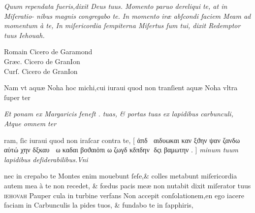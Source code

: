 \documentclass{article}
\newcommand{\threecolumntypefacenames}[3]{\begin{multicols}{3}
		\tiny
		\hfill \qquad \qquad \qquad \qquad #1\hspace*{\fill}\\
		\columnbreak
		\hfill #2\hspace*{\fill}\\
		\columnbreak
		\hfill #3\qquad \qquad \qquad \qquad \hspace*{\fill}
\end{multicols}}
\begin{document}
{\begin{multicols}{2}
	\columnbreak
	\fontsize{8}{9}\selectfont
	\justifying
	\noindent
	\textit{Quum rependata fueris,dixit Deus tuus. Momento paruo dereliqui te, at in Miſeratio-\linebreak
		nibus magnis congregabo te. In momento ir\ae{} abſcondi faciem {M}eam ad momentum \`a te,\linebreak
		In miſericordia ſempiterna Miſertus ſum tui, dixit Redemptor tuus Iehouah.}
\end{multicols}
\vspace{-3.5\baselineskip}
\threecolumntypefacenames{Romain Cicero de Garamond}{Gr\ae{}c. Cicero de GranIon}{Curſ. Cicero de GranIon}
\vspace{-2.5\baselineskip}
\begin{multicols}{2}
	\fontsize{7}{8}\selectfont
	\justifying
	\noindent \quad Nam vt aqu\ae{} Noha hoc michi,cui iuraui quod non tranſient aqu\ae{} Noha vltra ſuper ter\linebreak

	\columnbreak
	\justifying
	\noindent
	\textit{Et ponam ex {M}argaricis feneſt . tuas, \& portas tuas ex lapidibus carbunculi, Atque omnem ter\linebreak}
\end{multicols}
\fontsize{7}{8}\selectfont
\vspace{-2.5\baselineskip}
\noindent ram, ſic iuraui quod non iraſcar contra te, [ %
		{\grecs ἀπδ αιδυωκαι καν ξϑην ψαν ζανδω αὐτώ χην δξκαυ  ωκαδαι βοϑαιὀπι ωζωγδ κδπδην δςι βαμωτην \scalebox{0.5}{}\kern-2pt\scalebox{1.2}{}.} ] \textit{minum tuum lapidibus deſiderabilibus.Vni\linebreak}
\vspace{-2.55\baselineskip}
\begin{multicols}{2}
	\fontsize{7}{8}\selectfont
	\justifying
	\noindent nec in crepabo te Montes enim mouebunt ſeſe,\& colles metabunt miſericordia autem mea\linebreak
	\`a te non recedet, \& f\oe{}dus pacis me\ae{} non nutabit dixit miſerator tuus \textsc{ iehovah} Pauper\linebreak
	cula in turbine verfans Non accepit conſolationem,en ego iacere faciam in Carbunculis la\linebreak
	pides tuos, \& fundabo te in ſapphiris,


\end{multicols}}
\end{document}
